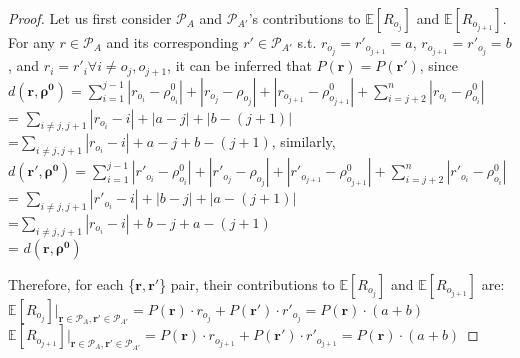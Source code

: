 \documentclass[11pt, oneside]{article}   	%
\begin{document}
\begin{proof}
Let us first consider $\mathcal{P}_A$ and $\mathcal{P}_{A'}$'s contributions to $\mathbb{E}[R_{o_{j}}]$ and $\mathbb{E}[R_{o_{j+1}}]$.
For any $r \in \mathcal{P}_A$ and its corresponding $r' \in \mathcal{P}_{A'}$ s.t. $r_{o_j} = r'_{o_{j+1}} = a$, $r_{o_{j+1}} = r'_{o_{j}} = b$, and $r_i = r'_i \forall i\neq o_j, o_{j+1}$, it can be inferred that $P(\bm{r}) = P(\bm{r'})$, since \\
$d(\bm{r}, \bm{\rho^0}) = \sum\limits_{i=1}^{j-1}|r_{o_i} - \rho^0_{o_i}| + |r_{o_j} - \rho_{o_j}| + |r_{o_{j+1}} - \rho^0_{o_{j+1}}| + \sum\limits_{i = j+2}^{n}|r_{o_i} - \rho^0_{o_{i}}|$ \\
= $\sum\limits_{i \neq j, j+1} |r_{o_i} - i| + |a-j| + |b - (j+1)|$\\
=$\sum\limits_{i \neq j, j+1} |r_{o_i} - i| + a-j + b - (j+1)$, similarly, \\

$d(\bm{r'}, \bm{\rho^0}) = \sum\limits_{i=1}^{j-1}|r'_{o_i} - \rho^0_{o_i}| + |r'_{o_j} - \rho_{o_j}| + |r'_{o_{j+1}} - \rho^0_{o_{j+1}}| + \sum\limits_{i = j+2}^{n}|r'_{o_i} - \rho^0_{o_{i}}|$ \\
= $\sum\limits_{i \neq j, j+1} |r'_{o_i} - i| + |b-j| + |a - (j+1)|$\\
=$\sum\limits_{i \neq j, j+1} |r_{o_i} - i| + b-j + a - (j+1)$ \\
= $d(\bm{r}, \bm{\rho^0}) $

Therefore, for each \{$\bm{r}, \bm{r'}$\} pair, their contributions to $\mathbb{E}[R_{o_j}]$ and $\mathbb{E}[R_{o_{j+1}}]$ are: \\
$\mathbb{E}[R_{o_j}]|_{\bm{r}\in \mathcal{P}_A,\bm{r'}\in \mathcal{P}_{A'}} = P(\bm{r})\cdot r_{o_j} + P(\bm{r'})\cdot r'_{o_j} = P(\bm{r})\cdot (a+b) $ \\

$\mathbb{E}[R_{o_{j+1}}]|_{\bm{r}\in \mathcal{P}_A,\bm{r'}\in \mathcal{P}_{A'}} = P(\bm{r})\cdot r_{o_{j+1}} + P(\bm{r'})\cdot r'_{o_{j+1}} = P(\bm{r})\cdot (a+b)$ 
\end{proof}
\end{document}
